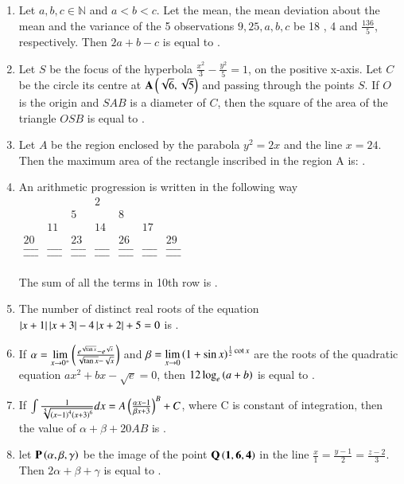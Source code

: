 \documentclass[journal]{IEEEtran}
\begin{document}
\begin{enumerate}[start=16]
\item %
Let $a,b,c \in \mathbb{N}$ and $a<b<c$. Let the mean, the mean deviation about the mean and the variance of the 5 observations $9,25,a,b,c$ be 18 , 4 and $\frac{136}{5}$, respectively. Then $2a+b-c$ is equal to \underline{\hspace{1cm}}.
\item %
Let $S$ be the focus of the hyperbola $\frac{x^2}{3} - \frac{y^2}{5} = 1$, on the positive x-axis. Let $C$ be the circle its centre at $\mathbf{A\left(\sqrt{6},\sqrt{5}\right)}$ and passing through the points $S$. If $O$ is the origin and $SAB$ is a diameter of $C$, then the square of the area of the triangle $OSB$ is equal to \underline{\hspace{1cm}}. 




\item %
Let $A$ be the region enclosed by the parabola $y^2 = 2x$ and the line $x=24$. Then the maximum area of the rectangle inscribed in the region A is: \underline{\hspace{1cm}}.
\item %
An arithmetic progression is written in the following way 
$
\begin{array}{ccccccc}
& & & 2\\
& & 5 & & 8 & & \\
& 11 &  & 14 & & 17 & \\
20 & & 23 & & 26 & & 29  \\
\_ \_ \_ \_ & \_ \_ \_ \_ & \_ \_ \_ \_ & \_ \_ \_ \_ & \_ \_ \_ \_ & \_ \_ \_ \_ & \_ \_ \_ \_ \\
\_ \_ \_ \_ & \_ \_ \_ \_ & \_ \_ \_ \_ & \_ \_ \_ \_ & \_ \_ \_ \_ & \_ \_ \_ \_ & \_ \_ \_ \_ 
\end{array}
$\\
\\
The sum of all the terms in 10th row is \underline{\hspace{1cm}}.
\item %
The number of distinct real roots of the equation $\left\vert x + 1\right\vert \left\vert x + 3\right\vert - 4\left\vert x + 2\right\vert + 5 = 0$ is \underline{\hspace{1cm}}.
\item %
If $\alpha = \lim\limits_{x \to 0^+} \left(\frac{e^{\sqrt{\tan{x}}} - e^{\sqrt{x}}}{\sqrt{\tan{x}}-\sqrt{x}}\right)$ and $\beta = \lim\limits_{x \to 0}\left(1+\sin{x}\right)^{\frac{1}{2}\cot{x}}$ are the roots of the quadratic equation $ax^2+bx-\sqrt{e} = 0$, then $12 \log_e \left(a+b\right)$ is equal to \underline{\hspace{1cm}}. 
\item %
If $  \int \frac{1}{\sqrt[5]{\left(x-1\right)^4\left(x+3\right)^6}} dx = A\left(\frac{\alpha x -1}{\beta x + 3}\right)^B + C$, where C is constant of integration, then the value of $\alpha + \beta +20AB$ is \underline{\hspace{1cm}}.
\item %
let $\mathbf{P\left(\alpha , \beta , \gamma \right)}$ be the image of the point $\mathbf{Q\left(1 , 6, 4\right)}$ in the line $\frac{x}{1} = \frac{y-1}{2} = \frac{z-2}{3}$. Then $2\alpha +\beta +\gamma$ is equal to \underline{\hspace{1cm}}.
\end{enumerate}
\end{document}

